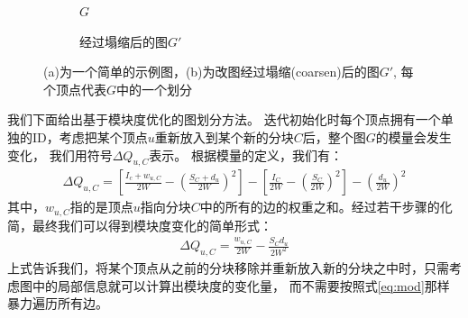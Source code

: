 \documentclass[master]{njuthesis}
\begin{document}
\begin{figure}[t]
    \centering
    \begin{subfigure}[b]{0.48\linewidth}        %
        \centering
        \label{fig:two:one}
	\resizebox{!}{!}{}
	\caption{$G$}
	\label{fig:figure2:figure1} 
	\end{subfigure}
    \begin{subfigure}[b]{0.48\linewidth}        %
     \centering
	\resizebox{!}{!}{}
	\caption{经过塌缩后的图$G\prime$}
	\label{fig:figure2:figure2}
    \end{subfigure}
    \caption{(a)为一个简单的示例图，(b)为改图经过塌缩(coarsen)后的图$G\prime$, 每个顶点代表$G$中的一个划分}
    \label{fig:two}
\end{figure}
我们下面给出基于模块度优化的图划分方法。
迭代初始化时每个顶点拥有一个单独的ID，考虑把某个顶点$u$重新放入到某个新的分块$C$后，整个图$G$的模量会发生变化，
我们用符号$\Delta Q_{u,C}$表示。
根据模量的定义，我们有：
\begin{equation}
\begin{aligned}
 \Delta Q_{u,C}=\left[ \frac{I_c+w_{u,C}}{2W} - {\left(\frac{S_C + d_u}{2W} \right)}^2 \right] -
 \left[ \frac{I_C}{2W} - {\left(\frac{S_C}{2W} \right)}^2 \right] - {\left(\frac{d_u}{2W}\right)}^2 
\end{aligned}
\end{equation}
其中，$w_{u,C}$指的是顶点$u$指向分块$C$中的所有的边的权重之和。经过若干步骤的化简，最终我们可以得到模块度变化的简单形式：
\begin{equation}
\begin{aligned}
 \Delta Q_{u,C}=\frac{w_{u,C}}{2W} - \frac{S_Cd_u}{2W^2} 
\end{aligned}
\end{equation}
上式告诉我们，将某个顶点从之前的分块移除并重新放入新的分块之中时，只需考虑图中的局部信息就可以计算出模块度的变化量，
而不需要按照式\ref{eq:mod}那样暴力遍历所有边。
\end{document}
